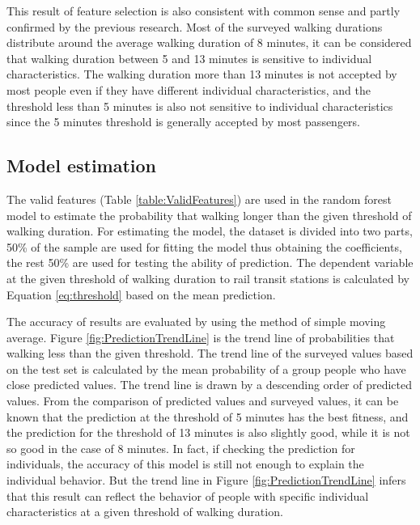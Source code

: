 \documentclass[sustainability,article,submit,moreauthors,pdftex,10pt,a4paper]{Definitions/mdpi}
\begin{document}
% 
This result of feature selection is also consistent with common sense and partly confirmed by the previous research. Most of the surveyed walking durations distribute around the average walking duration of 8 minutes, it can be considered that walking duration between 5 and 13 minutes is sensitive to individual characteristics. The walking duration more than 13 minutes is not accepted by most people even if they have different individual characteristics, and the threshold less than 5 minutes is also not sensitive to individual characteristics since the 5 minutes threshold is generally accepted by most passengers.

%
\subsection{Model estimation}
The valid features (Table \ref{table:ValidFeatures}) are used in the random forest model to estimate the probability that walking longer than the given threshold of walking duration. For estimating the model, the dataset is divided into two parts, 50\% of the sample are used for fitting the model thus obtaining the coefficients, the rest 50\% are used for testing the ability of prediction. The dependent variable at the given threshold of walking duration to rail transit stations is calculated by Equation \ref{eq:threshold} based on the mean prediction.

%
The accuracy of results are evaluated by using the method of simple moving average. Figure \ref{fig:PredictionTrendLine} is the trend line of probabilities that walking less than the given threshold. The trend line of the surveyed values based on the test set is calculated by the mean probability of a group people who have close predicted values. The trend line is drawn by a descending order of predicted values. From the comparison of predicted values and surveyed values, it can be known that the prediction at the threshold of 5 minutes has the best fitness, and the prediction for the threshold of 13 minutes is also slightly good, while it is not so good in the case of 8 minutes. In fact, if checking the prediction for individuals, the accuracy of this model is still not enough to explain the individual behavior. But the trend line in Figure \ref{fig:PredictionTrendLine} infers that this result can reflect the behavior of people with specific individual characteristics at a given threshold of walking duration. 
\end{document}
